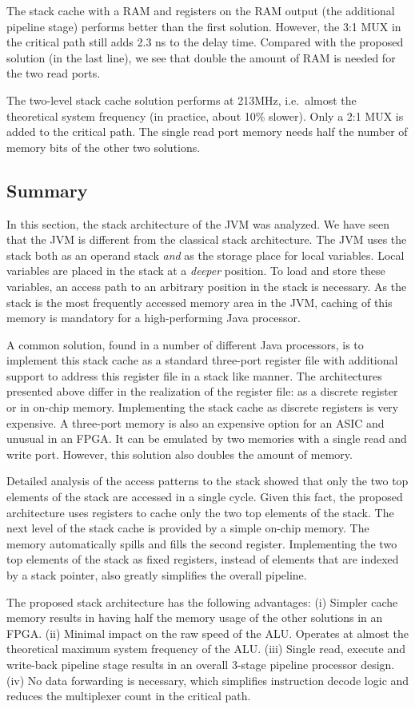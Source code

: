 The stack cache with a RAM and registers on the RAM output (the additional
pipeline stage) performs better than the first solution. However, the 3:1
MUX in the critical path still adds 2.3 ns to the delay time. Compared with
the proposed solution (in the last line), we see that double the amount of
RAM is needed for the two read ports.

The two-level stack cache solution performs at 213MHz, i.e.\ almost
the theoretical system frequency (in practice, about 10{\%} slower).
Only a 2:1 MUX is added to the critical path. The single read port
memory needs half the number of memory bits of the other two
solutions.

\subsection{Summary}

In this section, the stack architecture of the JVM was analyzed. We
have seen that the JVM is different from the classical stack
architecture. The JVM uses the stack both as an operand stack
\textit{and} as the storage place for local variables. Local
variables are placed in the stack at a \textit{deeper} position. To
load and store these variables, an access path to an arbitrary
position in the stack is necessary. As the stack is the most
frequently accessed memory area in the JVM, caching of this memory
is mandatory for a high-performing Java processor.

A common solution, found in a number of different Java processors,
is to implement this stack cache as a standard three-port register
file with additional support to address this register file in a
stack like manner. The architectures presented above differ in the
realization of the register file: as a discrete register or in
on-chip memory. Implementing the stack cache as discrete registers
is very expensive. A three-port memory is also an expensive option
for an ASIC and unusual in an FPGA. It can be emulated by two
memories with a single read and write port. However, this solution
also doubles the amount of memory.

Detailed analysis of the access patterns to the stack showed that
only the two top elements of the stack are accessed in a single
cycle. Given this fact, the proposed architecture uses registers to
cache only the two top elements of the stack. The next level of the
stack cache is provided by a simple on-chip memory. The memory
automatically spills and fills the second register. Implementing the
two top elements of the stack as fixed registers, instead of
elements that are indexed by a stack pointer, also greatly
simplifies the overall pipeline.

The proposed stack architecture has the following advantages: (i)
Simpler cache memory results in having half the memory usage of the
other solutions in an FPGA. (ii) Minimal impact on the raw speed of
the ALU. Operates at almost the theoretical maximum system frequency
of the ALU. (iii) Single read, execute and write-back pipeline stage
results in an overall 3-stage pipeline processor design. (iv) No
data forwarding is necessary, which simplifies instruction decode
logic and reduces the multiplexer count in the critical path.
